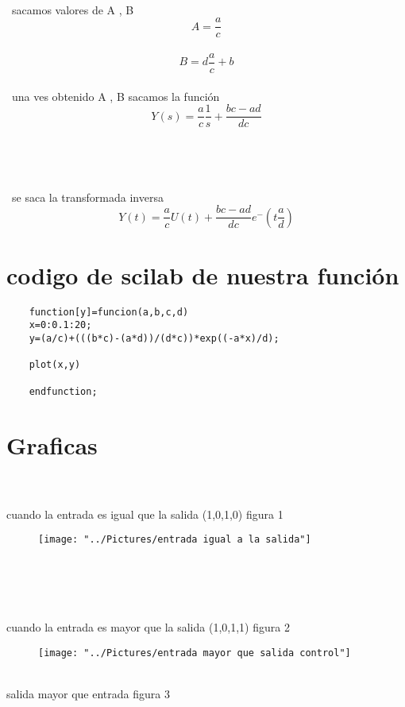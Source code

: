 \documentclass[12pt]{article}
\begin{document}
\\\ sacamos valores de A , B \begin{equation}
A=\frac{a}{c} 
\end{equation} 
\\ \begin{equation}
B=d\frac{a}{c}+b
\end{equation} 
\\\ una ves obtenido A , B sacamos la función \begin{equation}
Y(s)=\frac{a}{c} \frac{1}{s}+\frac{bc-ad}{dc}
\end{equation}
\\\ 
\\\
\\\
\\\ se saca la transformada inversa \begin{equation}
Y(t)=\frac{a}{c} U(t) + \frac{bc-ad}{dc} e^-(t\frac{a}{d})
\end{equation}

\section{codigo de scilab de nuestra función}
\begin{lstlisting}
	function[y]=funcion(a,b,c,d)
	x=0:0.1:20;
	y=(a/c)+(((b*c)-(a*d))/(d*c))*exp((-a*x)/d);
	
	plot(x,y)
	
	endfunction;
\end{lstlisting}
\section{Graficas} \\
\\ cuando la entrada es igual que la salida (1,0,1,0) figura 1 
\begin{figure}[h]
\centering
\texttt{[image: "../Pictures/entrada igual a la salida"]}
\caption{}
\label{fig:entrada-igual-a-la-salida}
\end{figure}
\\
\\
\\ 
\\ cuando la entrada es mayor que la salida (1,0,1,1) figura 2
\begin{figure}[h]
\centering
\texttt{[image: "../Pictures/entrada mayor que salida control"]}
\caption{}
\label{fig:entrada-mayor-que-salida-control}
\end{figure}
\\ salida mayor que entrada figura 3
\end{document}
